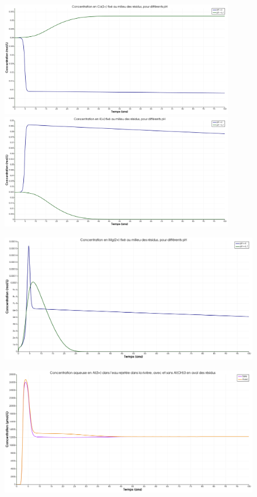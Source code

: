 \documentclass{article}
\begin{document}
\begin{figure}[H]
    \centering
    \begin{minipage}{0.5\textwidth}
        \centering
        \includegraphics[width=0.9\textwidth]{III_B_2_15.png} 
        \caption{}
        \label{fig:Ca_residus_comparaison}
    \end{minipage}\hfill
    \begin{minipage}{0.5\textwidth}
        \centering
        \includegraphics[width=0.9\textwidth]{III_B_2_16.png} 
        \caption{}
        \label{fig:K_residus_comparaison}
    \end{minipage}
\end{figure}

\begin{figure}[H]
    \centering
    \includegraphics[width=0.5\linewidth]{III_B_2_17.png}
    \caption{}
    \label{fig:Mg_residus_comparaison}
\end{figure}

\begin{figure}[H]
    \centering
    \includegraphics[width=0.5\linewidth]{III_B_2_24.png}
    \caption{}
    \label{fig:Al_riviere_comparaison_Al}
\end{figure}
\end{document}
